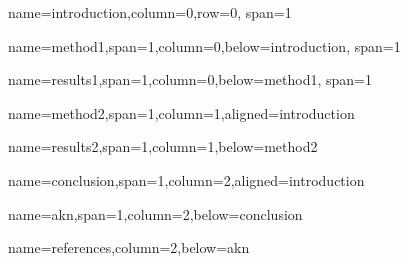\documentclass[paperwidth=160cm,paperheight=100cm,portrait,fontscale=0.2941]{baposter}
\begin{document}
\begin{poster}
{name=introduction,column=0,row=0, span=1}
{\parskip 5pt   

}


{name=method1,span=1,column=0,below=introduction, span=1}
{\parskip 5pt 

}

{name=results1,span=1,column=0,below=method1, span=1}
{\parskip 5pt 

}


{name=method2,span=1,column=1,aligned=introduction}
{\parskip 5pt 


}

{name=results2,span=1,column=1,below=method2}
{\parskip 5pt


}


{name=conclusion,span=1,column=2,aligned=introduction}
{\parskip 5pt

}


{name=akn,span=1,column=2,below=conclusion}
{\parskip 5pt

}


{name=references,column=2,below=akn}
{
\renewcommand{\section}[2]{}%
\footnotesize
}



\end{poster}
\end{document}
